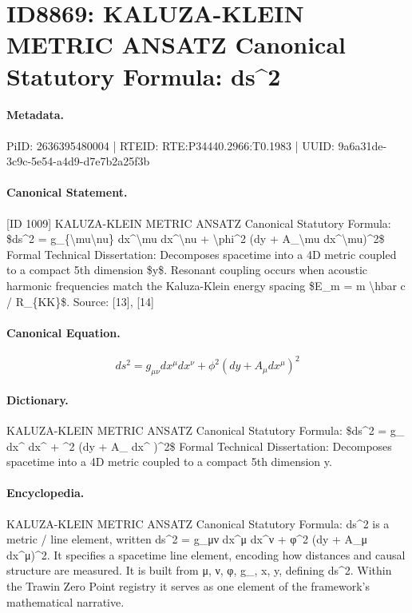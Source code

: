 \section*{ID8869: KALUZA-KLEIN METRIC ANSATZ Canonical Statutory Formula: ds\textasciicircum{}2}
\paragraph{Metadata.}
PiID: 2636395480004 | RTEID: RTE:P34440.2966:T0.1983 | UUID: 9a6a31de-3c9c-5e54-a4d9-d7e7b2a25f3b

\paragraph{Canonical Statement.}
[ID 1009] KALUZA-KLEIN METRIC ANSATZ Canonical Statutory Formula: \$ds\textasciicircum{}2 = g\_\{\textbackslash{}mu\textbackslash{}nu\} dx\textasciicircum{}\textbackslash{}mu dx\textasciicircum{}\textbackslash{}nu + \textbackslash{}phi\textasciicircum{}2 (dy + A\_\textbackslash{}mu dx\textasciicircum{}\textbackslash{}mu)\textasciicircum{}2\$ Formal Technical Dissertation: Decomposes spacetime into a 4D metric coupled to a compact 5th dimension \$y\$. Resonant coupling occurs when acoustic harmonic frequencies match the Kaluza-Klein energy spacing \$E\_m = m \textbackslash{}hbar c / R\_\{KK\}\$. Source: [13], [14]

\paragraph{Canonical Equation.}
\[
ds^2 = g_{\mu\nu} dx^\mu dx^\nu + \phi^2 (dy + A_\mu dx^\mu)^2
\]

\paragraph{Dictionary.}
KALUZA-KLEIN METRIC ANSATZ Canonical Statutory Formula: \$ds\textasciicircum{}2 = g\_ dx\textasciicircum{} dx\textasciicircum{} + \textasciicircum{}2 (dy + A\_ dx\textasciicircum{} )\textasciicircum{}2\$ Formal Technical Dissertation: Decomposes spacetime into a 4D metric coupled to a compact 5th dimension y.

\paragraph{Encyclopedia.}
KALUZA-KLEIN METRIC ANSATZ Canonical Statutory Formula: ds\textasciicircum{}2 is a metric / line element, written ds\textasciicircum{}2 = g\_μν dx\textasciicircum{}μ dx\textasciicircum{}ν + φ\textasciicircum{}2 (dy + A\_μ dx\textasciicircum{}μ)\textasciicircum{}2. It specifies a spacetime line element, encoding how distances and causal structure are measured. It is built from μ, ν, φ, g\_, x, y, defining ds\textasciicircum{}2. Within the Trawin Zero Point registry it serves as one element of the framework's mathematical narrative.
